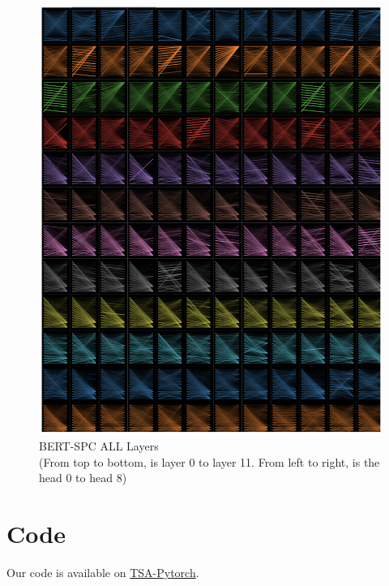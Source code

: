 \documentclass[fyp]{socreport}
\begin{document}
\begin{figure}[h]
    \centering
    \includegraphics[width=\linewidth]{./image/spc_all.png}
    \caption{BERT-SPC ALL Layers\\
    (From top to bottom, is layer 0 to layer 11. From left to right, is the head 0 to head 8)}
  \label{spc_all}
\end{figure}






\chapter{Code}
Our code is available on \href{https://github.com/Xiang-Pan/TSA-PyTorch}{TSA-Pytorch}.
\end{document}
